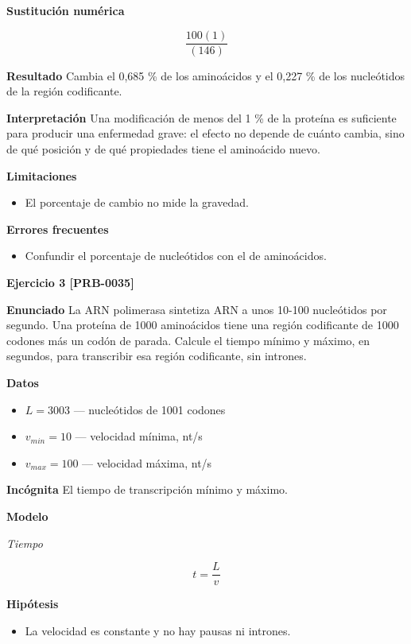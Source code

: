 \documentclass{book}
\begin{document}
\noindent\textbf{Sustitución numérica}

\[
\frac{100 \left(1\right)}{\left(146\right)}
\]

\noindent\textbf{Resultado}
Cambia el 0,685 \% de los aminoácidos y el 0,227 \% de los nucleótidos de la región codificante.


\noindent\textbf{Interpretación}
Una modificación de menos del 1 \% de la proteína es suficiente para producir una enfermedad grave: el efecto no depende de cuánto cambia, sino de qué posición y de qué propiedades tiene el aminoácido nuevo.


\noindent\textbf{Limitaciones}
\begin{itemize}
\item El porcentaje de cambio no mide la gravedad.
\end{itemize}

\noindent\textbf{Errores frecuentes}
\begin{itemize}
\item Confundir el porcentaje de nucleótidos con el de aminoácidos.
\end{itemize}

\noindent\textbf{Ejercicio 3 [PRB-0035]}

\noindent\textbf{Enunciado}
La ARN polimerasa sintetiza ARN a unos 10-100 nucleótidos por segundo. Una proteína de 1000 aminoácidos tiene una región codificante de 1000 codones más un codón de parada. Calcule el tiempo mínimo y máximo, en segundos, para transcribir esa región codificante, sin intrones.


\noindent\textbf{Datos}
\begin{itemize}
\item $L = 3003$ — nucleótidos de 1001 codones
\item $v_{min} = 10$ — velocidad mínima, nt/s
\item $v_{max} = 100$ — velocidad máxima, nt/s
\end{itemize}

\noindent\textbf{Incógnita}
El tiempo de transcripción mínimo y máximo.


\noindent\textbf{Modelo}

\noindent\textit{Tiempo}

\[
t = \frac{L}{v}
\]

\noindent\textbf{Hipótesis}
\begin{itemize}
\item La velocidad es constante y no hay pausas ni intrones.
\end{itemize}
\end{document}

